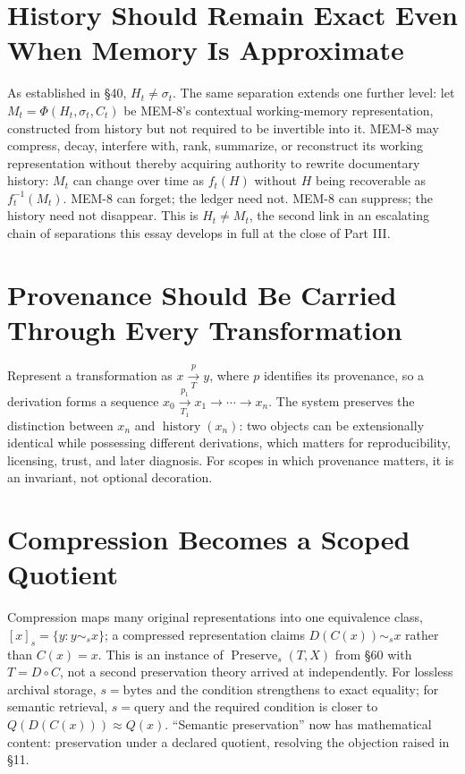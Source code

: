\documentclass[12pt]{article}
\begin{document}
\section{History Should Remain Exact Even When Memory Is Approximate}

As established in \S40, $H_t\neq\sigma_t$. The same separation extends one further level: let $M_t=\Phi(H_t,\sigma_t,C_t)$ be MEM-8's contextual working-memory representation, constructed from history but not required to be invertible into it. MEM-8 may compress, decay, interfere with, rank, summarize, or reconstruct its working representation without thereby acquiring authority to rewrite documentary history: $M_t$ can change over time as $f_t(H)$ without $H$ being recoverable as $f_t^{-1}(M_t)$. MEM-8 can forget; the ledger need not. MEM-8 can suppress; the history need not disappear. This is $H_t\neq M_t$, the second link in an escalating chain of separations this essay develops in full at the close of Part III.

\section{Provenance Should Be Carried Through Every Transformation}

Represent a transformation as $x\xrightarrow[T]{p}y$, where $p$ identifies its provenance, so a derivation forms a sequence $x_0\xrightarrow[T_1]{p_1}x_1\to\cdots\to x_n$. The system preserves the distinction between $x_n$ and $\operatorname{history}(x_n)$: two objects can be extensionally identical while possessing different derivations, which matters for reproducibility, licensing, trust, and later diagnosis. For scopes in which provenance matters, it is an invariant, not optional decoration.

\section{Compression Becomes a Scoped Quotient}

Compression maps many original representations into one equivalence class, $[x]_s=\{y:y\sim_s x\}$; a compressed representation claims $D(C(x))\sim_s x$ rather than $C(x)=x$. This is an instance of $\operatorname{Preserve}_s(T,X)$ from \S60 with $T=D\circ C$, not a second preservation theory arrived at independently. For lossless archival storage, $s=\mathrm{bytes}$ and the condition strengthens to exact equality; for semantic retrieval, $s=\mathrm{query}$ and the required condition is closer to $Q(D(C(x)))\approx Q(x)$. ``Semantic preservation'' now has mathematical content: preservation under a declared quotient, resolving the objection raised in \S11.
\end{document}
